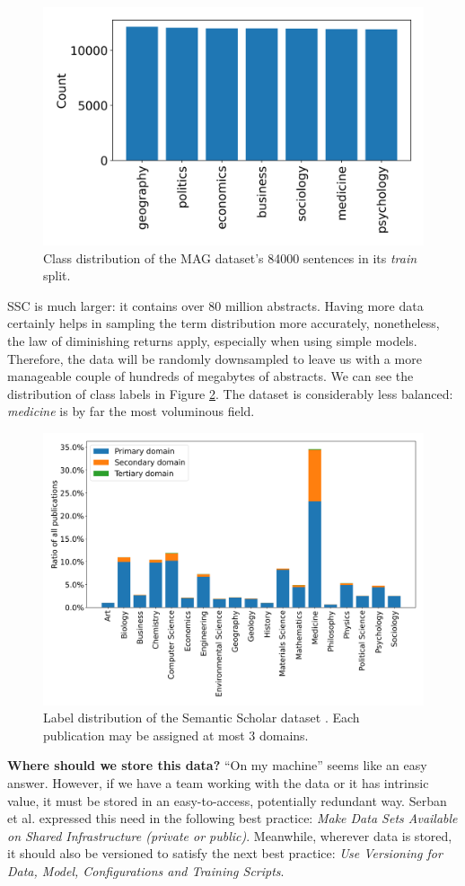 \begin{figure}
    \centering
    \includegraphics[width=0.5\linewidth]{figures/mag-distribution.png}
    \caption{Class distribution of the MAG  \cite{wang2019review} dataset's 84000 sentences in its \textit{train} split.}
    \label{fig:mag-distribtion}
\end{figure}

SSC is much larger: it contains over 80 million abstracts. Having more data certainly helps in sampling the term distribution more accurately, nonetheless, the law of diminishing returns apply, especially when using simple models. Therefore, the data will be randomly downsampled to leave us with a more manageable couple of hundreds of megabytes of abstracts. We can see the distribution of class labels in Figure \ref{fig:ss-distribution}. The dataset is considerably less balanced: \textit{medicine} is by far the most voluminous field.

\begin{figure}
    \centering
    \includegraphics[width=0.8\linewidth]{figures/ss-distribution.png}
    \caption{Label distribution of the Semantic Scholar dataset \cite{Lo2020S2ORCTS}. Each publication may be assigned at most 3 domains.}
    \label{fig:ss-distribution}
\end{figure}

\begin{displayquote}
\textbf{Where should we store this data?} ``On my machine'' seems like an easy answer. However, if we have a team working with the data or it has intrinsic value, it must be stored in an easy-to-access, potentially redundant way. Serban et al. \cite{serban2020adoption} expressed this need in the following best practice: \textit{Make Data Sets Available on Shared Infrastructure (private or public)}. Meanwhile, wherever data is stored, it should also be versioned to satisfy the next best practice: \textit{Use Versioning for Data, Model, Configurations and Training Scripts}.
\end{displayquote}

